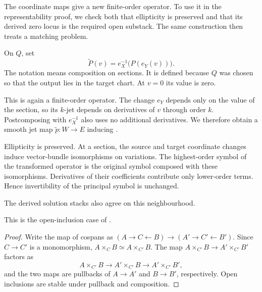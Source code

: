 The coordinate maps give a new finite-order operator. To use it in
the representability proof, we check both that ellipticity is preserved
and that its derived zero locus is the required open substack.
The same construction then treats a matching problem.

On $Q$, set
\begin{equation}\label{eq:Locally_Reduced_Operator}
 \widetilde P(v)=e_X^{-1}\bigl(P(e_Y(v))\bigr).
\end{equation}
The notation means composition on sections. It is defined because
$Q$ was chosen so that the output lies in the target chart.
At $v=0$ its value is zero.

This is again a finite-order operator. The change $e_Y$ depends only
on the value of the section, so its $k$-jet depends on derivatives
of $v$ through order $k$. Postcomposing with $e_X^{-1}$ also uses
no additional derivatives. We therefore obtain a smooth jet map
$\widetilde p\colon W\to E$ inducing .

Ellipticity is preserved. At a section, the source and target coordinate
changes induce vector-bundle isomorphisms on variations.
The highest-order symbol of the transformed operator is the original
symbol composed with these isomorphisms. Derivatives of their coefficients
contribute only lower-order terms. Hence invertibility of the principal
symbol is unchanged.

The derived solution stacks also agree on this neighbourhood.


This is the open-inclusion case of
\cite[Lemma~3.4.4]{Steffens_Representability_Elliptic_Moduli}.

\begin{proof}
Write the map of cospans as $(A\to C\leftarrow B)\to(A'\to C'\leftarrow B')$.
Since $C\to C'$ is a monomorphism, $A\times_CB\simeq A\times_{C'}B$.
The map $A\times_{C'}B\to A'\times_{C'}B'$ factors as
\[
 A\times_{C'}B\longrightarrow A'\times_{C'}B\longrightarrow A'\times_{C'}B',
\]
and the two maps are pullbacks of $A\to A'$ and $B\to B'$, respectively.
Open inclusions are stable under pullback and composition.
\end{proof}

